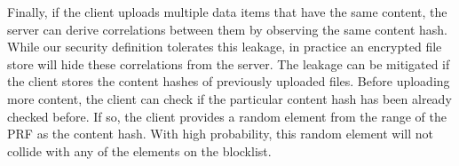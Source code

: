 Finally, if the client uploads multiple data items that have the same content, the server can derive correlations between them by observing the same content hash. While our security definition tolerates this leakage, in practice an encrypted file store will hide these correlations from the server. The leakage can be mitigated if the client stores the content hashes of previously uploaded files. Before uploading more content, the client can check if the particular content hash has been already checked before. If so, the client provides a random element from the range of the PRF as the content hash. With high probability, this random element will not collide with any of the elements on the blocklist. 
\fi 






\iffalse 



 \setcounter{auditorLineNmbr}{0}
\setcounter{clientLineNmbr}{0}
\setcounter{serverLineNmbr}{0}

